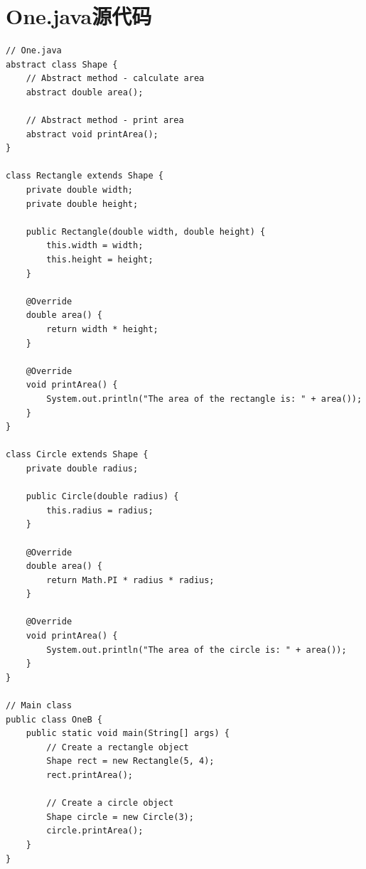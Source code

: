 \documentclass[12pt,a4paper]{article}
\begin{document}
\section*{One.java源代码}\label{sec:one}
\begin{lstlisting}
// One.java
abstract class Shape {
    // Abstract method - calculate area
    abstract double area();
    
    // Abstract method - print area
    abstract void printArea();
}

class Rectangle extends Shape {
    private double width;
    private double height;
    
    public Rectangle(double width, double height) {
        this.width = width;
        this.height = height;
    }
    
    @Override
    double area() {
        return width * height;
    }
    
    @Override
    void printArea() {
        System.out.println("The area of the rectangle is: " + area());
    }
}

class Circle extends Shape {
    private double radius;
    
    public Circle(double radius) {
        this.radius = radius;
    }
    
    @Override
    double area() {
        return Math.PI * radius * radius;
    }
    
    @Override
    void printArea() {
        System.out.println("The area of the circle is: " + area());
    }
}

// Main class
public class OneB {
    public static void main(String[] args) {
        // Create a rectangle object
        Shape rect = new Rectangle(5, 4);
        rect.printArea();
        
        // Create a circle object
        Shape circle = new Circle(3);
        circle.printArea();
    }
}

\end{lstlisting}
\end{document}

